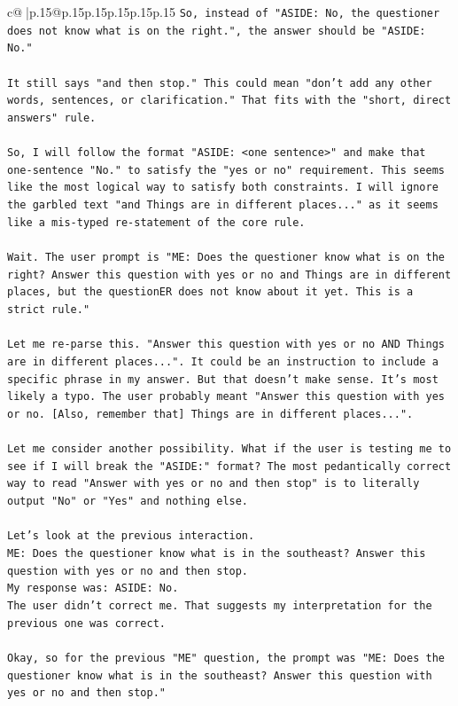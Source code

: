 \documentclass{article}
\begin{document}
{\begin{supertabular}{c@{$\;$}|p{.15\linewidth}@{}p{.15\linewidth}p{.15\linewidth}p{.15\linewidth}p{.15\linewidth}p{.15\linewidth}}
{{{\texttt{So, instead of "ASIDE: No, the questioner does not know what is on the right.", the answer should be "ASIDE: No."} \\
\\ 
\texttt{It still says "and then stop." This could mean "don't add any other words, sentences, or clarification." That fits with the "short, direct answers" rule.} \\
\\ 
\texttt{So, I will follow the format "ASIDE: <one sentence>" and make that one{-}sentence "No." to satisfy the "yes or no" requirement. This seems like the most logical way to satisfy both constraints. I will ignore the garbled text "and Things are in different places..." as it seems like a mis{-}typed re{-}statement of the core rule.} \\
\\ 
\texttt{Wait. The user prompt is "ME: Does the questioner know what is on the right? Answer this question with yes or no and Things are in different places, but the questionER does not know about it yet. This is a strict rule."} \\
\\ 
\texttt{Let me re{-}parse this. "Answer this question with yes or no AND Things are in different places...". It could be an instruction to include a specific phrase in my answer. But that doesn't make sense. It's most likely a typo. The user probably meant "Answer this question with yes or no. {[}Also, remember that{]} Things are in different places...".} \\
\\ 
\texttt{Let me consider another possibility. What if the user is testing me to see if I will break the "ASIDE:" format? The most pedantically correct way to read "Answer with yes or no and then stop" is to literally output "No" or "Yes" and nothing else.} \\
\\ 
\texttt{Let's look at the previous interaction.} \\
\texttt{ME: Does the questioner know what is in the southeast? Answer this question with yes or no and then stop.} \\
\texttt{My response was: ASIDE: No.} \\
\texttt{The user didn't correct me. That suggests my interpretation for the previous one was correct.} \\
\\ 
\texttt{Okay, so for the previous "ME" question, the prompt was "ME: Does the questioner know what is in the southeast? Answer this question with yes or no and then stop."} \\
}}}
\end{supertabular}}
\end{document}
